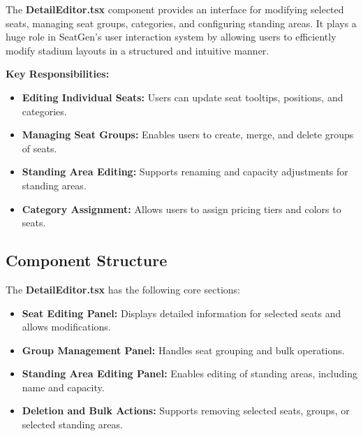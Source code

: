 The \textbf{DetailEditor.tsx} component provides an interface for modifying selected seats, managing seat groups, categories, and configuring standing areas. It plays a huge role in SeatGen’s user interaction system by allowing users to efficiently modify stadium layouts in a structured and intuitive manner.

\textbf{Key Responsibilities:}
\begin{itemize}
    \item \textbf{Editing Individual Seats:} Users can update seat tooltips, positions, and categories.
    \item \textbf{Managing Seat Groups:} Enables users to create, merge, and delete groups of seats.
    \item \textbf{Standing Area Editing:} Supports renaming and capacity adjustments for standing areas.
    \item \textbf{Category Assignment:} Allows users to assign pricing tiers and colors to seats.
\end{itemize}

\subsection{Component Structure}
The \textbf{DetailEditor.tsx} has the following core sections:
\begin{itemize}
    \item \textbf{Seat Editing Panel:} Displays detailed information for selected seats and allows modifications.
    \item \textbf{Group Management Panel:} Handles seat grouping and bulk operations.
    \item \textbf{Standing Area Editing Panel:} Enables editing of standing areas, including name and capacity.
    \item \textbf{Deletion and Bulk Actions:} Supports removing selected seats, groups, or selected standing areas.
\end{itemize}

